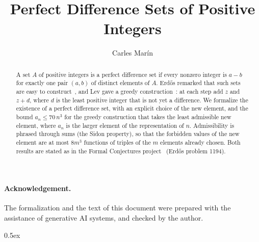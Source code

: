 \documentclass[10pt,a4paper]{article}
\begin{document}
\title{Perfect Difference Sets of Positive Integers}
\author{Carles Mar\'in}
\maketitle

\begin{abstract}
A set $A$ of positive integers is a perfect difference set if every nonzero integer is $a-b$ for exactly one
pair $(a,b)$ of distinct elements of $A$. Erd\H{o}s remarked that such sets are easy to construct~\cite{Er80},
and Lev gave a greedy construction~\cite{Lev04}: at each step add $z$ and $z+d$, where $d$ is the least positive
integer that is not yet a difference. We formalize the existence of a perfect difference set, with an explicit
choice of the new element, and the bound $a_n\le 70\,n^3$ for the greedy construction that takes the least
admissible new element, where $a_n$ is the larger element of the representation of $n$. Admissibility is phrased
through sums (the Sidon property), so that the forbidden values of the new element are at most $8m^3$ functions of
triples of the $m$ elements already chosen. Both results are stated as in the Formal Conjectures
project~\cite{FC} (Erd\H{o}s problem 1194).
\end{abstract}

\paragraph{Acknowledgement.} The formalization and the text of this document were prepared with the
assistance of generative AI systems, and checked by the author.

\tableofcontents

\parindent 0pt\parskip 0.5ex





\end{document}
